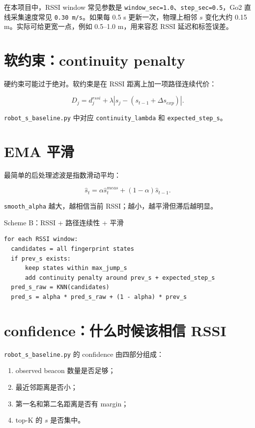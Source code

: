 \documentclass[11pt,a4paper,openany]{report}
\newcommand{\code}[1]{\nolinkurl{#1}}
\newcommand{\file}[1]{\nolinkurl{#1}}
\newcommand{\param}[1]{\nolinkurl{#1}}
\begin{document}
在本项目中，RSSI window 常见参数是 \code{window_sec=1.0}、\code{step_sec=0.5}，Go2 直线采集速度常见 \code{0.30 m/s}。如果每 0.5 s 更新一次，物理上相邻 \(s\) 变化大约 0.15 m。实际可给更宽一点，例如 0.5--1.0 m，用来容忍 RSSI 延迟和标签误差。

\section{软约束：continuity penalty}

硬约束可能过于绝对。软约束是在 RSSI 距离上加一项路径连续代价：

\[
  D_j
  =
  d_j^{rssi}
  +
  \lambda |s_j - (s_{t-1} + \Delta s_{exp})|.
\]

\file{robot_s_baseline.py} 中对应 \param{continuity_lambda} 和 \param{expected_step_s}。

\section{EMA 平滑}

最简单的后处理滤波是指数滑动平均：

\[
  \hat{s}_t
  =
  \alpha \hat{s}_t^{meas}
  +
  (1-\alpha)\hat{s}_{t-1}.
\]

\param{smooth_alpha} 越大，越相信当前 RSSI；越小，越平滑但滞后越明显。

\begin{algobox}{Scheme B：RSSI + 路径连续性 + 平滑}
\begin{lstlisting}
for each RSSI window:
  candidates = all fingerprint states
  if prev_s exists:
      keep states within max_jump_s
      add continuity penalty around prev_s + expected_step_s
  pred_s_raw = KNN(candidates)
  pred_s = alpha * pred_s_raw + (1 - alpha) * prev_s
\end{lstlisting}
\end{algobox}

\section{confidence：什么时候该相信 RSSI}

\file{robot_s_baseline.py} 的 confidence 由四部分组成：

\begin{enumerate}
  \item observed beacon 数量是否足够；
  \item 最近邻距离是否小；
  \item 第一名和第二名距离是否有 margin；
  \item top-K 的 \(s\) 是否集中。
\end{enumerate}
\end{document}

